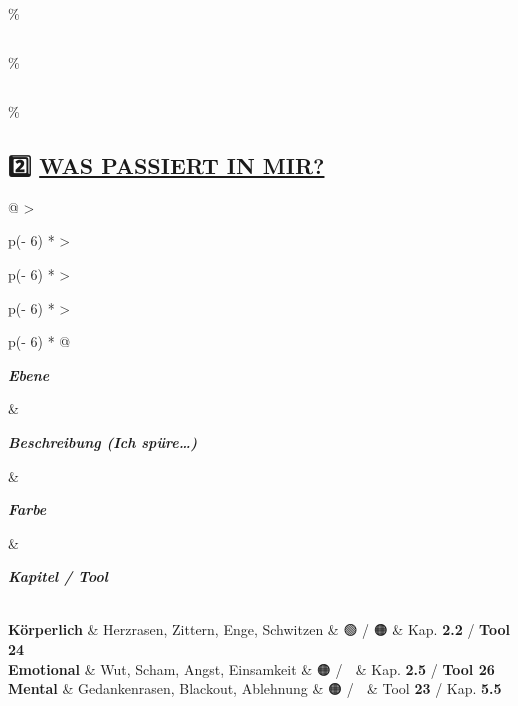 \hypertarget{section-2}{\%
\subsection{}\label{section-2}}

\hypertarget{section-3}{\%
\subsection{}\label{section-3}}

\hypertarget{was-passiert-in-mir-1}{\%
\subsection{\texorpdfstring{2️⃣ \textbf{\ul{WAS PASSIERT IN MIR?}}}{2️⃣ WAS PASSIERT IN MIR?}}\label{was-passiert-in-mir-1}}

\begin{longtable}[]{@{}
  >{\raggedright\arraybackslash}p{(\columnwidth - 6\tabcolsep) * }
  >{\raggedright\arraybackslash}p{(\columnwidth - 6\tabcolsep) * }
  >{\raggedright\arraybackslash}p{(\columnwidth - 6\tabcolsep) * }
  >{\raggedright\arraybackslash}p{(\columnwidth - 6\tabcolsep) * }@{}}
\toprule\noalign{}
\begin{minipage}[b]{\linewidth}\raggedright
\emph{\textbf{Ebene}}
\end{minipage} \& \begin{minipage}[b]{\linewidth}\raggedright
\emph{\textbf{Beschreibung (Ich spüre\ldots)}}
\end{minipage} \& \begin{minipage}[b]{\linewidth}\raggedright
\emph{\textbf{Farbe}}
\end{minipage} \& \begin{minipage}[b]{\linewidth}\raggedright
\emph{\textbf{Kapitel / Tool}}
\end{minipage} \\
\midrule\noalign{}
\endhead
\bottomrule\noalign{}
\endlastfoot
\textbf{Körperlich} \& Herzrasen, Zittern, Enge, Schwitzen \& 🟢 / 🟠 \& Kap. \textbf{2.2} / \textbf{Tool 24} \\
\textbf{Emotional} \& Wut, Scham, Angst, Einsamkeit \& 🟠 / 🔴 \& Kap. \textbf{2.5} / \textbf{Tool 26} \\
\textbf{Mental} \& Gedankenrasen, Blackout, Ablehnung \& 🟠 / 🔴 \& Tool \textbf{23} / Kap. \textbf{5.5} \\
\end{longtable}

